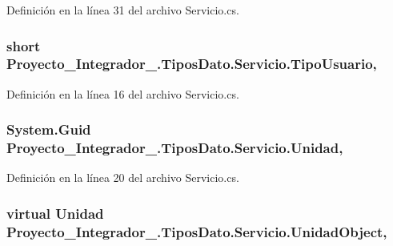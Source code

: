 Definición en la línea 31 del archivo Servicio.\-cs.

\hypertarget{class_proyecto___integrador__3_1_1_tipos_dato_1_1_servicio_a756753eda712db3ba3d85b87bd35ba3a}{
\subsubsection[{Tipo\-Usuario}]{\setlength{\rightskip}{0pt plus 5cm}short Proyecto\-\_\-\-Integrador\-\_.\-Tipos\-Dato.\-Servicio.\-Tipo\-Usuario\hspace{0.3cm}{\ttfamily [get]}, {\ttfamily [set]}}}\label{class_proyecto___integrador__3_1_1_tipos_dato_1_1_servicio_a756753eda712db3ba3d85b87bd35ba3a}


Definición en la línea 16 del archivo Servicio.\-cs.

\hypertarget{class_proyecto___integrador__3_1_1_tipos_dato_1_1_servicio_a44520809b1552502c483547044c33d6e}{
\subsubsection[{Unidad}]{\setlength{\rightskip}{0pt plus 5cm}System.\-Guid Proyecto\-\_\-\-Integrador\-\_.\-Tipos\-Dato.\-Servicio.\-Unidad\hspace{0.3cm}{\ttfamily [get]}, {\ttfamily [set]}}}\label{class_proyecto___integrador__3_1_1_tipos_dato_1_1_servicio_a44520809b1552502c483547044c33d6e}


Definición en la línea 20 del archivo Servicio.\-cs.

\hypertarget{class_proyecto___integrador__3_1_1_tipos_dato_1_1_servicio_acc976af62324d86c48a8143ae605dc07}{
\subsubsection[{Unidad\-Object}]{\setlength{\rightskip}{0pt plus 5cm}virtual {\bf Unidad} Proyecto\-\_\-\-Integrador\-\_.\-Tipos\-Dato.\-Servicio.\-Unidad\-Object\hspace{0.3cm}{\ttfamily [get]}, {\ttfamily [set]}}}\label{class_proyecto___integrador__3_1_1_tipos_dato_1_1_servicio_acc976af62324d86c48a8143ae605dc07}



